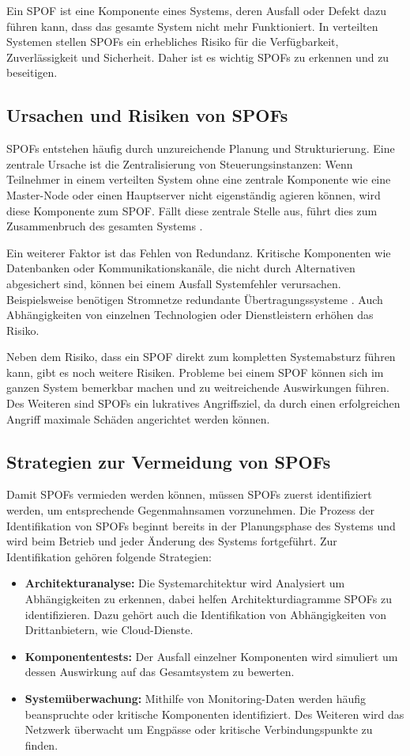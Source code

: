 \documentclass[a4paper,12pt]{article}
\begin{document}
Ein SPOF ist eine Komponente eines Systems, deren Ausfall oder Defekt dazu führen kann, dass das gesamte System nicht mehr Funktioniert. In verteilten Systemen stellen SPOFs ein erhebliches Risiko für die Verfügbarkeit, Zuverlässigkeit und Sicherheit. Daher ist es wichtig SPOFs zu erkennen und zu beseitigen. 

\subsection{Ursachen und Risiken von SPOFs}
SPOFs entstehen häufig durch unzureichende Planung und Strukturierung. Eine zentrale Ursache ist die Zentralisierung von Steuerungsinstanzen: Wenn Teilnehmer in einem verteilten System ohne eine zentrale Komponente wie eine Master-Node oder einen Hauptserver nicht eigenständig agieren können, wird diese Komponente zum SPOF. Fällt diese zentrale Stelle aus, führt dies zum Zusammenbruch des gesamten Systems \cite[S. 253f.]{Steen2006}.

Ein weiterer Faktor ist das Fehlen von Redundanz. Kritische Komponenten wie Datenbanken oder Kommunikationskanäle, die nicht durch Alternativen abgesichert sind, können bei einem Ausfall Systemfehler verursachen. Beispielsweise benötigen Stromnetze redundante Übertragungssysteme \cite[S. 61f.]{Jarass2009}. Auch Abhängigkeiten von einzelnen Technologien oder Dienstleistern erhöhen das Risiko. 

Neben dem Risiko, dass ein SPOF direkt zum kompletten Systemabsturz führen kann, gibt es noch weitere Risiken. Probleme bei einem SPOF können sich im ganzen System bemerkbar machen und zu weitreichende Auswirkungen führen. Des Weiteren sind SPOFs ein lukratives Angriffsziel, da durch einen erfolgreichen Angriff maximale Schäden angerichtet werden können.

\subsection{Strategien zur Vermeidung von SPOFs}

Damit SPOFs vermieden werden können, müssen SPOFs zuerst identifiziert werden, um entsprechende Gegenmahnsamen vorzunehmen. Die Prozess der Identifikation von SPOFs beginnt bereits in der Planungsphase des Systems und wird beim Betrieb und jeder Änderung des Systems fortgeführt. Zur Identifikation gehören folgende Strategien:

\begin{itemize}
    \item \textbf{Architekturanalyse:} Die Systemarchitektur wird Analysiert um Abhängigkeiten zu erkennen, dabei helfen Architekturdiagramme SPOFs zu identifizieren. Dazu gehört auch die Identifikation von Abhängigkeiten von Drittanbietern, wie Cloud-Dienste.
    \item \textbf{Komponententests:} Der Ausfall einzelner Komponenten wird simuliert um dessen Auswirkung auf das Gesamtsystem zu bewerten.
    \item \textbf{Systemüberwachung:} Mithilfe von Monitoring-Daten werden häufig beanspruchte oder kritische Komponenten identifiziert. Des Weiteren wird das Netzwerk überwacht um Engpässe oder kritische Verbindungspunkte zu finden. 
\end{itemize}
\end{document}
